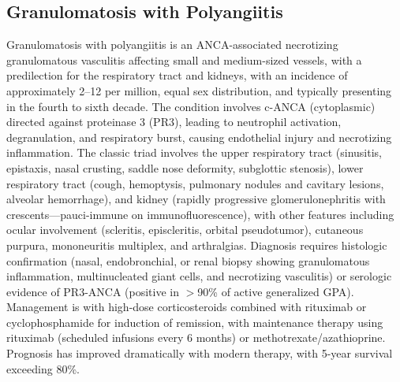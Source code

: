 \subsection{Granulomatosis with Polyangiitis}
\label{sec:Granulomatosis with Polyangiitis (GPA)}
Granulomatosis with polyangiitis is an ANCA-associated necrotizing granulomatous vasculitis affecting small and medium-sized vessels, with a predilection for the respiratory tract and kidneys, with an incidence of approximately 2--12 per million, equal sex distribution, and typically presenting in the fourth to sixth decade. The condition involves c-ANCA (cytoplasmic) directed against proteinase 3 (PR3), leading to neutrophil activation, degranulation, and respiratory burst, causing endothelial injury and necrotizing inflammation. The classic triad involves the upper respiratory tract (sinusitis, epistaxis, nasal crusting, saddle nose deformity, subglottic stenosis), lower respiratory tract (cough, hemoptysis, pulmonary nodules and cavitary lesions, alveolar hemorrhage), and kidney (rapidly progressive glomerulonephritis with crescents---pauci-immune on immunofluorescence), with other features including ocular involvement (scleritis, episcleritis, orbital pseudotumor), cutaneous purpura, mononeuritis multiplex, and arthralgias. Diagnosis requires histologic confirmation (nasal, endobronchial, or renal biopsy showing granulomatous inflammation, multinucleated giant cells, and necrotizing vasculitis) or serologic evidence of PR3-ANCA (positive in $>$90\% of active generalized GPA). Management is with high-dose corticosteroids combined with rituximab or cyclophosphamide for induction of remission, with maintenance therapy using rituximab (scheduled infusions every 6 months) or methotrexate/azathioprine. Prognosis has improved dramatically with modern therapy, with 5-year survival exceeding 80\%.

